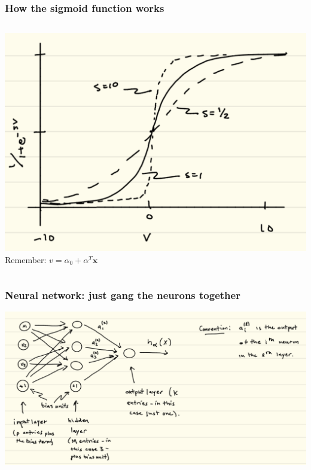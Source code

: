 \documentclass[mathserif, aspectratio=169]{beamer}
\begin{document}
\begin{frame}[t]\frametitle{How the sigmoid function works}
    
    \pause
    \begin{columns}

	\includegraphics[height = 0.9\textheight]{sigmoid_examples.pdf}
	Remember: $v = \alpha_0 + \alpha^T \mathbf{x}$
	\end{columns}
\end{frame}

\begin{frame}[t]\frametitle{Neural network: just gang the neurons together}
    
    \pause

	\includegraphics[height = 0.9\textheight]{NN.pdf}
\end{frame}
\end{document}
